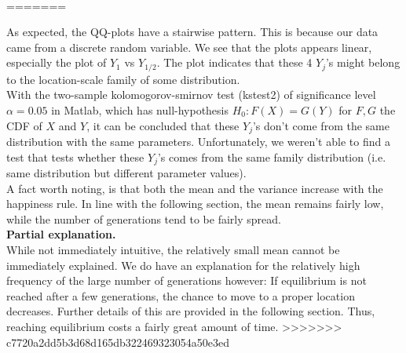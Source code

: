 \\
=======

As expected, the QQ-plots have a stairwise pattern. 
This is because our data came from a discrete random variable. 
We see that the plots appears linear, especially the plot of $Y_{1}$ vs $Y_{1/2}$. 
The plot indicates that these 4 $Y_j$'s might belong to the location-scale family of some distribution.\\

With the two-sample kolomogorov-smirnov test (kstest2) of significance level $\alpha=0.05$ in Matlab, which has null-hypothesis $H_0:F(X)=G(Y)$ for $F,G$ the CDF of $X$ and $Y$, it can be concluded that these $Y_j$'s don't come from the same distribution with the same parameters. 
Unfortunately, we weren't able to find a test that tests whether these $Y_j$'s comes from the same family distribution (i.e. same distribution but different parameter values).\\

A fact worth noting, is that both the mean and the variance increase with the happiness rule. In line with the following section, the mean remains fairly low, while the number of generations tend to be fairly spread.\\

\textbf{Partial explanation.} \\
While not immediately intuitive, the relatively small mean cannot be immediately explained. We do have an explanation for the relatively high frequency of the large number of generations however: 
If equilibrium is not reached after a few generations, the chance to move to a proper location decreases. 
Further details of this are provided in the following section. 
Thus, reaching equilibrium costs a fairly great amount of time.
>>>>>>> c7720a2dd5b3d68d165db322469323054a50e3ed

